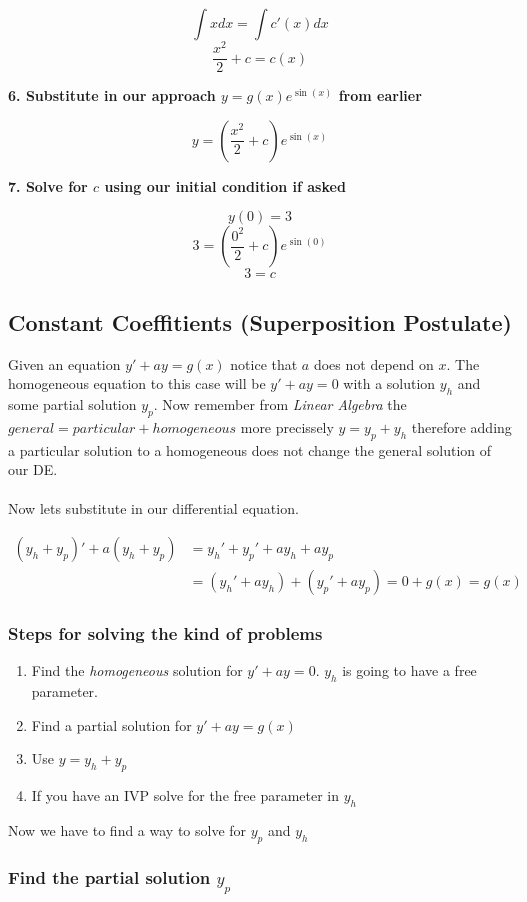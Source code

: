 \[\int x dx= \int c'(x)dx\]
\[\frac{x^2}{2} + c = c(x)\]

\textbf{6. Substitute in our approach \(y = g(x)e^{\sin(x)}\) from earlier}

\[y = \left(\frac{x^2}{2} + c\right)e^{\sin(x)}\]

\textbf{7. Solve for \(c\) using our initial condition if asked}

\[y(0) = 3\]
\[3 = \left(\frac{0^2}{2} + c\right)e^{\sin(0)}\]
\[3 = c\]


\subsection{Constant Coeffitients (Superposition Postulate)}

Given an equation \(y' + ay = g(x)\) notice that \(a\) does not depend on \(x\).
The homogeneous equation to this case will be \(y' + ay = 0\) with a solution \(y_h\) and some
partial solution \(y_p\). Now remember from \emph{Linear Algebra} the \(general = particular + homogeneous\)
more precissely \(y = y_p + y_h\) therefore adding a particular solution to a homogeneous does not change
the general solution of our DE.
\\\\
Now lets substitute in our differential equation.

\begin{align*}
(y_h + y_p)' + a(y_h + y_p) &= y_h' + y_p' + ay_h + ay_p\\   
&= (y_h' + ay_h) + (y_p' + ay_p) = 0 + g(x) = g(x) 
\end{align*}

\subsubsection*{Steps for solving the kind of problems}
\begin{enumerate}
    \item Find the \emph{homogeneous} solution for \(y' + ay = 0\). \(y_h\) is going
    to have a free parameter.
    \item Find a partial solution for \(y' + ay = g(x)\)
    \item Use \(y = y_h + y_p\)
    \item If you have an IVP solve for the free parameter in \(y_h\)
\end{enumerate}

Now we have to find a way to solve for \(y_p\) and \(y_h\)

\subsubsection{Find the partial solution \(y_p\)}

